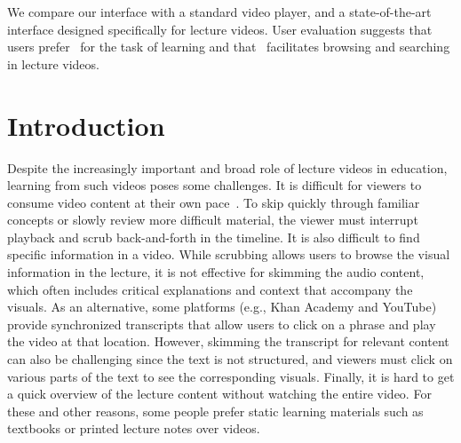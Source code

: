 We compare our interface with a standard video player, and a state-of-the-art interface designed specifically for 
lecture videos. User evaluation suggests that users prefer \systemname\ for the task of learning and that \systemname\
facilitates browsing and searching in lecture videos.


\section{Introduction}
Despite the increasingly important and broad role of lecture videos in education, learning from such videos poses some challenges. 
%
It is difficult for viewers to consume video content at their own pace~\cite{chi2012mixt}.
%
To skip quickly through familiar concepts or slowly review more difficult material, the viewer must interrupt playback and scrub back-and-forth in the timeline.
%
It is also difficult to find specific information in a video. While scrubbing allows users to browse the visual information in the lecture, it is not effective for skimming the audio content, which often includes critical explanations and context that accompany the visuals. As an alternative, some platforms (e.g., Khan Academy and YouTube) provide synchronized transcripts that allow users to click on a phrase and play the video at that location. However, skimming the transcript for relevant content can also be challenging since the text is not structured, and viewers must click on various parts of the text to see the corresponding visuals. 
%
Finally, it is hard to get a quick overview of the lecture content without watching the entire video. 
For these and other reasons, some people prefer static learning materials such as textbooks or printed lecture notes over videos.\\

